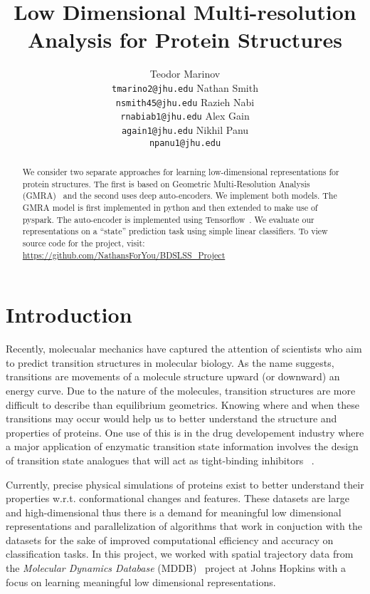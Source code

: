 \documentclass{article}
\title{Low Dimensional Multi-resolution Analysis for Protein Structures}
\author{
	Teodor Marinov\\
	\texttt{tmarino2@jhu.edu} \And
	Nathan Smith\\
	\texttt{nsmith45@jhu.edu} \And
	Razieh Nabi\\
	\texttt{rnabiab1@jhu.edu} \And
	Alex Gain\\
	\texttt{again1@jhu.edu} \And
	Nikhil Panu\\
	\texttt{npanu1@jhu.edu}
}
\begin{document}
	
	\maketitle
	
	\begin{abstract}
		We consider two separate approaches for learning low-dimensional representations for protein structures. The first is based on Geometric Multi-Resolution Analysis (GMRA)~\cite{allard2012multi} and the second uses deep auto-encoders. We implement both models. The GMRA model is first implemented in python and then extended to make use of pyspark. The auto-encoder is implemented using Tensorflow~\cite{abadi2016tensorflow}. We evaluate our representations on a ``state'' prediction task using simple linear classifiers. To view source code for the project, visit: \url{https://github.com/NathansForYou/BDSLSS_Project}
	\end{abstract}
	
	\section{Introduction}
	Recently, molecualar mechanics have captured the attention of scientists who aim to predict transition structures in molecular biology. As the name suggests, transitions are movements of a molecule structure upward (or downward) an energy curve. Due to the nature of the molecules, transition structures are more difficult to describe than equilibrium geometrics. %
	Knowing where and when these transitions may occur would help us to better understand the structure and properties of proteins. One use of this is in the drug developement industry where a major application of enzymatic transition state information involves the design of transition state analogues that will act as tight-binding inhibitors ~\cite{Schramm}. 
	
	Currently, precise physical simulations of proteins exist to better understand their properties w.r.t. conformational changes and features. These datasets are large and high-dimensional thus there is a demand for meaningful low dimensional representations and parallelization of algorithms that work in conjuction with the datasets for the sake of improved computational efficiency and accuracy on classification tasks. In this project, we worked with spatial trajectory data from the \textit{Molecular Dynamics Database} (MDDB)~\cite{Nutanong:2013:AEL:2484838.2484872} project at Johns Hopkins with a focus on learning meaningful low dimensional representations.
	
\end{document}
